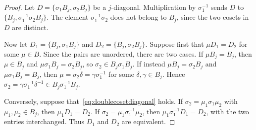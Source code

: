 \documentclass[10pt,a4paper]{amsart}
\begin{document}
\begin{proof}
Let $D=\{\sigma_1B_j,\sigma_2B_j\}$ be a $j$-diagonal. Multiplication by $\sigma_1^{-1}$ sends $D$ to
$\{B_j,\sigma_1^{-1}\sigma_2B_j\}$.
The element $\sigma_1^{-1}\sigma_2$ does not belong to $B_j$, since the two cosets in $D$ are distinct.

Now let $
D_1=\{B_j,\sigma_1B_j\}$ and
$D_2=\{B_j,\sigma_2B_j\}$. Suppose first that $\mu D_1=D_2$ for some $ \mu\in B$. Since the pairs are unordered, there are two cases. If $\mu B_j=B_j$, then $\mu \in B_j$ and $ \mu \sigma_1B_j=\sigma_2B_j$, so $\sigma_2\in B_j\sigma_1B_j$. If instead $\mu B_j=\sigma_2B_j$ and $\mu \sigma_1B_j=B_j$, then $\mu=\sigma_2\delta=\gamma\sigma_1^{-1}$ for some $\delta,\gamma\in B_j$. Hence $\sigma_2=\gamma\sigma_1^{-1}\delta^{-1}\in B_j\sigma_1^{-1}B_j$.

Conversely, suppose that~\eqref{eq:doublecosetdiagonal} holds. If $\sigma_2=\mu_1\sigma_1\mu_2$ with $\mu_1,\mu_2\in B_j$, then $\mu_1D_1=D_2$. If $\sigma_2=\mu_1\sigma_1^{-1}\mu_2$, then $\mu_1\sigma_1^{-1}D_1=D_2$, with the two entries interchanged. Thus $D_1$ and $D_2$ are equivalent.
\end{proof}
\end{document}
